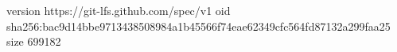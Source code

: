 version https://git-lfs.github.com/spec/v1
oid sha256:bac9d14bbe9713438508984a1b45566f74eae62349cfc564fd87132a299faa25
size 699182
